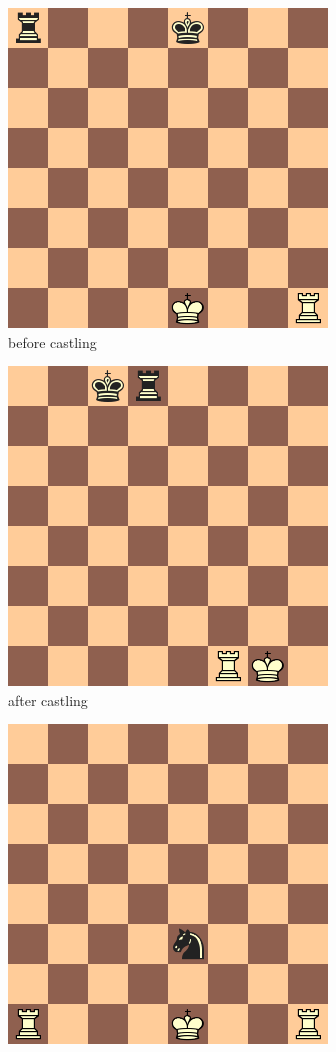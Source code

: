 \begin{figure}
\centering
\begin{subfigure}[b]{0.4\textwidth}
\includegraphics[scale=0.5]{fig/rules/castle_before}
\caption{before castling}
\label{fig:castle_bef}
\end{subfigure}
\qquad
\begin{subfigure}[b]{0.4\textwidth}
\includegraphics[scale=0.5]{fig/rules/castle_after}
\caption{after castling}
\label{fig:castle_aft}
\end{subfigure}
\qquad
\begin{subfigure}[b]{0.4\textwidth}
\includegraphics[scale=0.5]{fig/rules/castle_no}

\end{subfigure}
\end{figure}

